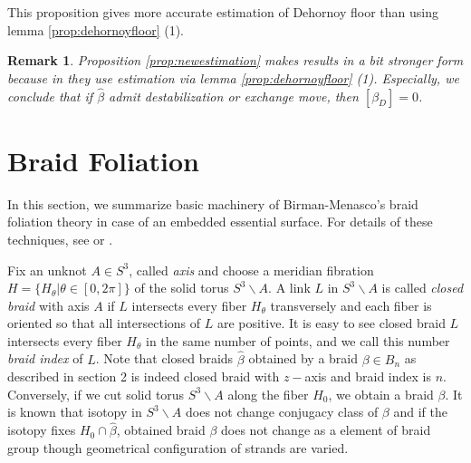 \documentclass[12pt]{amsart}
\newtheorem{rem}{Remark}}
\begin{document}
   This proposition gives more accurate estimation of Dehornoy floor than using lemma \ref{prop:dehornoyfloor} (1).
\begin{rem}
   Proposition \ref{prop:newestimation} makes results in \cite{mn} a bit stronger form because in \cite{mn} they use estimation via lemma \ref{prop:dehornoyfloor} (1). Especially, we conclude that if $\widehat{\beta}$ admit destabilization or exchange move, then $[\beta_{D}]=0$.
\end{rem}

\section{Braid Foliation}

   In this section, we summarize basic machinery of Birman-Menasco's braid foliation theory in case of an embedded essential surface. For details of these techniques, see \cite{bf} or \cite{bm2}.

   Fix an unknot $A \in S^{3}$, called {\it axis} and choose a meridian fibration $H = \{ H_{\theta}| \theta \in [0,2\pi]\}$ of the solid torus $S^{3} \backslash A$.
A link $L$ in $S^{3} \backslash A$ is called {\it closed braid} with axis $A$ if $L$ intersects every fiber $H_{\theta}$ transversely and each fiber is oriented so that all intersections of $L$ are positive. It is easy to see closed braid $L$ intersects every fiber $H_{\theta}$ in the same number of points, and we call this number {\it braid index} of $L$. 
Note that closed braids $\widehat{\beta}$ obtained by a braid $\beta\in B_{n}$ as described in section 2 is indeed closed braid with $z-$axis and braid index is $n$. Conversely, if we cut solid torus $S^{3}\backslash A$ along the fiber $H_{0}$, we obtain a braid $\beta$. It is known that isotopy in $S^{3}\backslash A$ does not change conjugacy class of $\beta$ and if the isotopy fixes $H_{0}\cap \widehat{\beta}$, obtained braid $\beta$ does not change as a element of braid group though geometrical configuration of strands are varied.  
\end{document}
